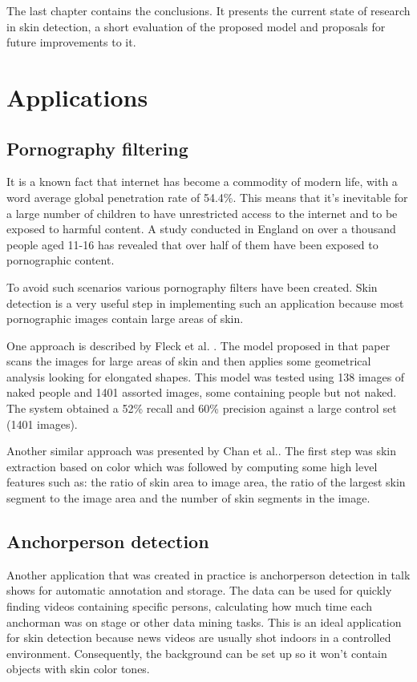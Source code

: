 \documentclass[12pt]{report}
\begin{document}
	The last chapter contains the conclusions. It presents the current state of research in skin detection, a short evaluation of the proposed model and proposals for future improvements to it.
	
	\section{Applications}
	
	\subsection{Pornography filtering}
	It is a known fact that internet has become a commodity of modern life, with a word average global penetration rate of 54.4\%\cite{internet_stats}. This means that it's inevitable for a large number of children to have unrestricted access to the internet and to be exposed to harmful content. A study conducted in England\cite{children_exposure} on over a thousand people aged 11-16 has revealed that over half of them have been exposed to pornographic content. 
	
	To avoid such scenarios various pornography filters have been created. Skin detection is a very useful step in implementing such an application because most pornographic images contain large areas of skin.
	
	One approach is described by Fleck et al. \cite{finding_naked_people}. The model proposed in that paper scans the images for large areas of skin and then applies some geometrical analysis looking for elongated shapes. This model was tested using 138 images of naked people and 1401 assorted images, some containing people but not naked. The system obtained a 52\% recall and 60\% precision against a large control set (1401 images).
	
	Another similar approach was presented by Chan et al.\cite{pornography_filter_with_ratios}. The first step was skin extraction based on color which was followed by computing some high level features such as: the ratio of skin area to image area, the ratio of the largest skin segment to the image area and the number of skin segments in the image.
	
	\subsection{Anchorperson detection}
	Another application that was created in practice is anchorperson detection in talk shows \cite{anchor_person_detection} for automatic annotation and storage. The data can be used for quickly finding videos containing specific persons, calculating how much time each anchorman was on stage or other data mining tasks. This is an ideal application for skin detection because news videos are usually shot indoors in a controlled environment. Consequently, the background can be set up so it won't contain objects with skin color tones.
	
\end{document}
